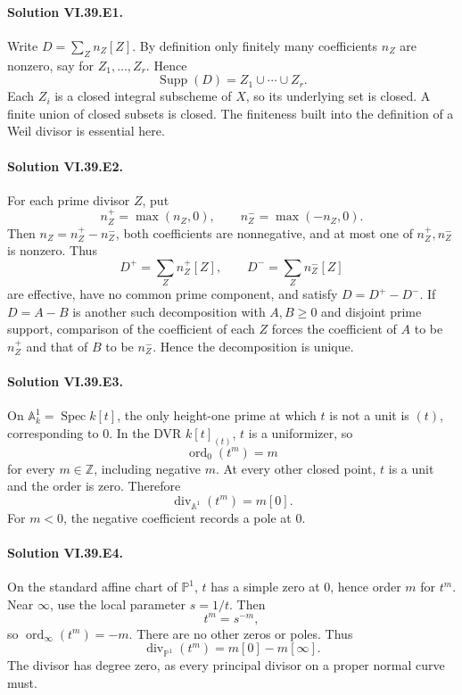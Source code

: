 
\paragraph{Solution VI.39.E1.}\label{sol:vi39-e01}
Write \(D=\sum_Z n_Z[Z]\).  By definition only finitely many coefficients \(n_Z\) are nonzero, say for \(Z_1,\ldots,Z_r\).  Hence
\[
 \operatorname{Supp}(D)=Z_1\cup\cdots\cup Z_r.
\]
Each \(Z_i\) is a closed integral subscheme of \(X\), so its underlying set is closed.  A finite union of closed subsets is closed.  The finiteness built into the definition of a Weil divisor is essential here.

\paragraph{Solution VI.39.E2.}\label{sol:vi39-e02}
For each prime divisor \(Z\), put
\[
 n_Z^+=\max(n_Z,0),\qquad n_Z^- = \max(-n_Z,0).
\]
Then \(n_Z=n_Z^+-n_Z^-\), both coefficients are nonnegative, and at most one of \(n_Z^+,n_Z^-\) is nonzero.  Thus
\[
 D^+=\sum_Z n_Z^+[Z],\qquad D^-=\sum_Z n_Z^-[Z]
\]
are effective, have no common prime component, and satisfy \(D=D^+-D^-\).  If \(D=A-B\) is another such decomposition with \(A,B\ge0\) and disjoint prime support, comparison of the coefficient of each \(Z\) forces the coefficient of \(A\) to be \(n_Z^+\) and that of \(B\) to be \(n_Z^-\).  Hence the decomposition is unique.

\paragraph{Solution VI.39.E3.}\label{sol:vi39-e03}
On \(\mathbb A^1_k=\operatorname{Spec}k[t]\), the only height-one prime at which \(t\) is not a unit is \((t)\), corresponding to \(0\).  In the DVR \(k[t]_{(t)}\), \(t\) is a uniformizer, so
\[
 \operatorname{ord}_0(t^m)=m
\]
for every \(m\in\mathbb Z\), including negative \(m\).  At every other closed point, \(t\) is a unit and the order is zero.  Therefore
\[
 \operatorname{div}_{\mathbb A^1}(t^m)=m[0].
\]
For \(m<0\), the negative coefficient records a pole at \(0\).

\paragraph{Solution VI.39.E4.}\label{sol:vi39-e04}
On the standard affine chart of \(\mathbb P^1\), \(t\) has a simple zero at \(0\), hence order \(m\) for \(t^m\).  Near \(\infty\), use the local parameter \(s=1/t\).  Then
\[
 t^m=s^{-m},
\]
so \(\operatorname{ord}_{\infty}(t^m)=-m\).  There are no other zeros or poles.  Thus
\[
 \operatorname{div}_{\mathbb P^1}(t^m)=m[0]-m[\infty].
\]
The divisor has degree zero, as every principal divisor on a proper normal curve must.

